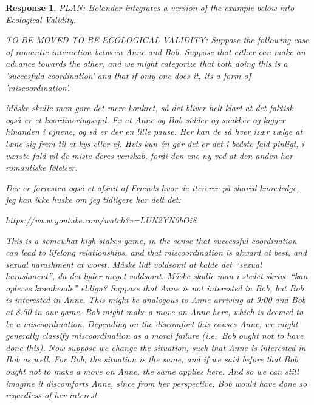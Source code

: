 \documentclass[a4paper]{article}
\newtheorem{response}{Response}
\newenvironment{tobo}{\smallskip \noindent \color{yellow!80!black!80}}{\color{black}\smallskip}
\begin{document}
\begin{response}

PLAN: Bolander integrates a version of the example below into Ecological Validity.

TO BE MOVED TO BE ECOLOGICAL VALIDITY:  Suppose the following case of romantic interaction between Anne and Bob. Suppose that either can make an advance towards the other, and we might categorize that both doing this is a 'succesfuld coordination' and that if only one does it, its a form of 'miscoordination'.

\begin{tobo}
Måske skulle man gøre det mere konkret, så det bliver helt klart at det faktisk også er et koordineringsspil. Fx at Anne og Bob sidder og snakker og kigger hinanden i øjnene, og så er der en lille pause. Her kan de så hver især vælge at læne sig frem til et kys eller ej. Hvis kun én gør det er det i bedste fald pinligt, i værste fald vil de miste deres venskab, fordi den ene ny ved at den anden har romantiske følelser. 

Der er forresten også et afsnit af Friends hvor de itererer på shared knowledge, jeg kan ikke huske om jeg tidligere har delt det: 

https://www.youtube.com/watch?v=LUN2YN0bOi8
\end{tobo}

This is a somewhat high stakes game, in the sense that successful coordination can lead to lifelong relationships, and that miscoordination is akward at best, and sexual harashment at worst.
\begin{tobo}
Måske lidt voldsomt at kalde det ``sexual harashment'', da det lyder meget voldsomt. Måske skulle man i stedet skrive ``kan opleves krænkende'' el.lign?
\end{tobo}
 Suppose that Anne is not interested in Bob, but Bob is interested in Anne. This might be analogous to Anne arriving at 9:00 and Bob at 8:50 in our game. Bob might make a move on Anne here, which is deemed to be a miscoordination. Depending on the discomfort this causes Anne, we might generally classify miscoordination as a moral failure (i.e.\ Bob ought not to have done this). Now suppose we change the situation, such that Anne is interested in Bob as well. For Bob, the situation is the same, and if we said before that Bob ought not to make a move on Anne, the same applies here. And so we can still imagine it discomforts Anne, since from her perspective, Bob would have done so regardless of her interest. 
 

\end{response}
\end{document}
